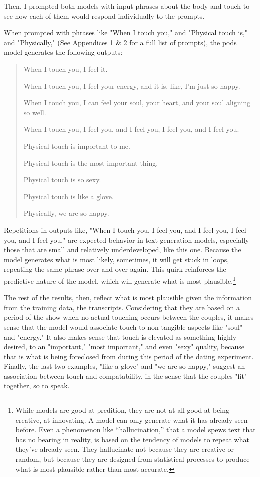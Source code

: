 \documentclass[11pt]{article}
\begin{document}
Then, I prompted both models with input phrases about the body and
touch to see how each of them would respond individually to the
prompts.

When prompted with phrases like "When I touch you," and "Physical
touch is," and "Physically," (See Appendices 1 \& 2 for a full list of
prompts), the pods model generates the following outputs:
\begin{quote}
When I touch you, I feel it.

When I touch you, I feel your energy, and it is, like, I'm just so
happy.

When I touch you, I can feel your soul, your heart, and your soul
aligning so well.

When I touch you, I feel you, and I feel you, I feel you, and I feel
you.

Physical touch is important to me.

Physical touch is the most important thing.

Physical touch is so sexy.

Physical touch is like a glove.

Physically, we are so happy.
\end{quote}
Repetitions in outputs like, "When I touch you, I feel you, and I feel
you, I feel you, and I feel you," are expected behavior in text
generation models, especially those that are small and relatively
underdeveloped, like this one. Because the model generates what is
most likely, sometimes, it will get stuck in loops, repeating the same
phrase over and over again. This quirk reinforces the predictive
nature of the model, which will generate what is most plausible.\footnote{While models are good at predition, they are not at all good at
being creative, at innovating. A model can only generate what it has
already seen before. Even a phenomenon like “hallucination,” that a
model spews text that has no bearing in reality, is based on the
tendency of models to repeat what they’ve already seen. They
hallucinate not because they are creative or random, but because they
are designed from statistical processes to produce what is most
plausible rather than most accurate.}

The rest of the results, then, reflect what is most plausible given
the information from the training data, the transcripts. Considering
that they are based on a period of the show when no actual touching
occurs between the couples, it makes sense that the model would
associate touch to non-tangible aspects like "soul" and "energy." It
also makes sense that touch is elevated as something highly desired,
to an "important," "most important," and even "sexy" quality, because
that is what is being foreclosed from during this period of the dating
experiment. Finally, the last two examples, "like a glove" and "we are
so happy," suggest an association between touch and compatability, in
the sense that the couples "fit" together, so to speak.
\end{document}
